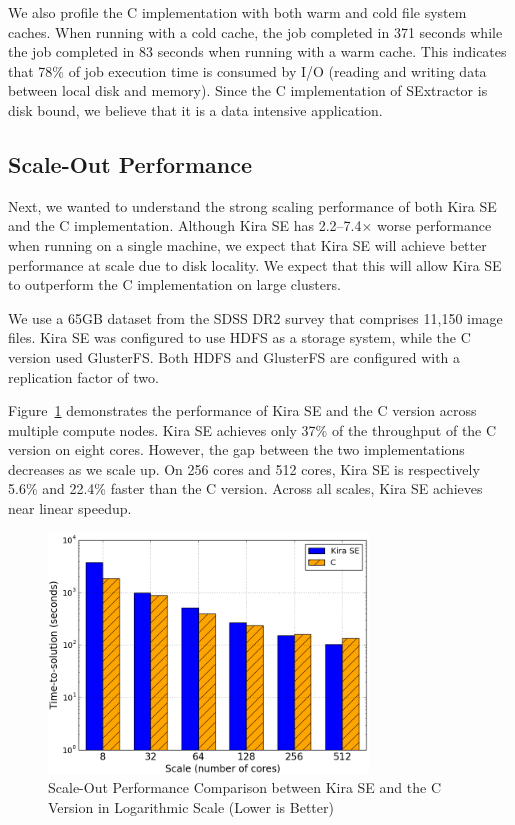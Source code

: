 \documentclass[10pt, conference, compsocconf]{IEEEtran}
\newcommand{\up}{\vspace*{-1em}}
\begin{document}
We also profile the C implementation with both warm and cold file system caches. When running with a
cold cache, the job completed in 371 seconds while the job completed in 83 seconds when
running with a warm cache. This indicates that 78\% of job execution time is consumed by
I/O (reading and writing data between local disk and memory). Since the C implementation of
SExtractor is disk bound, we believe that it is a data intensive application. 

\subsection{Scale-Out Performance}
\label{sec:Performance-scaleout}

Next, we wanted to understand the strong scaling performance of both Kira SE and the C
implementation. Although Kira SE has 2.2--7.4$\times$ worse performance when running on
a single machine, we expect that Kira SE will achieve better performance at scale due
to disk locality. We expect that this will allow Kira SE to outperform the C implementation
on large clusters.

We use a 65GB dataset from the SDSS DR2 survey that comprises 11,150 image files.
Kira SE was configured to use HDFS as a storage system, while the C version used GlusterFS. 
Both HDFS and GlusterFS are configured with a replication factor of two.

Figure~\ref{fig:scaleout} demonstrates the performance of Kira SE and the C version across
multiple compute nodes. Kira SE achieves only 37\% of the throughput of the C version
on eight cores. However, the gap between the two implementations decreases as we scale up. 
On 256 cores and 512 cores, Kira SE is respectively 5.6\% and 22.4\% faster than the C version.
Across all scales, Kira SE achieves near linear speedup.

\begin{figure}[h]
	\begin{center}
		\includegraphics[width=85mm]{pictures/scaleout}
		\caption{Scale-Out Performance Comparison between Kira SE and the C Version in Logarithmic Scale (Lower is Better)
		\label{fig:scaleout}}
		\up
  	\end{center}
\end{figure}
\end{document}
